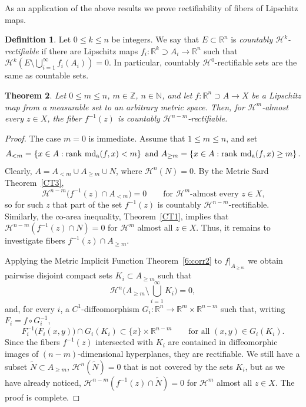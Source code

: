 \documentclass[12pt,leqno]{amsart}
\newtheorem{theorem}{Theorem}
\theoremstyle{definition}
\newtheorem{definition}[theorem]{Definition}
\newcommand{\bbbn}{\mathbb N}
\newcommand{\bbbz}{\mathbb Z}
\newcommand{\bbbr}{\mathbb R}
\def\H{{\mathcal H}}
\def\rank{{\rm rank\,}}
\def\apmd{\operatorname{md_{\rm a}}}
\numberwithin{theorem}{section} \numberwithin{equation}{section}
\begin{document}
As an application of the above results we prove rectifiability of fibers of Lipschitz maps.
\begin{definition}
Let $0\leq k\leq n$ be integers. We say that $E\subset\bbbr^n$ is {\em countably $\H^k$-rectifiable} if there are Lipschitz maps $f_i:\bbbr^k\supset A_i\to\bbbr^n$ such that $\H^k(E\setminus \bigcup_{i=1}^\infty f_i(A_i))=0$. In particular, countably $\H^0$-rectifiable sets are the same as countable sets.
\end{definition}

\begin{theorem}
\label{8.9}
Let $0\leq m\leq n$, $m\in\bbbz$, $n\in\bbbn$, and let
$f:\bbbr^n\supset A\to X$ be a Lipschitz map from a measurable set to an arbitrary metric space. Then, for
$\mathcal{H}^m$-almost every $z\in X$, the fiber $f^{-1}(z)$ is countably
$\mathcal{H}^{n-m}$-rectifiable.
\end{theorem}
\begin{proof}
The case $m=0$ is immediate. Assume that $1\leq m\leq n$, and set
\[
A_{<m}
=
\left\{
x\in A:
\rank\apmd(f,x)<m
\right\}
\text{ and }
A_{\geq m}
=
\left\{
x\in A:
\rank\apmd(f,x)\geq m
\right\}.
\]
Clearly, $A=A_{<m}\cup A_{\geq m}\cup N$, where $\H^n(N)=0$.
By the Metric Sard Theorem~\ref{CT3},
\[
\mathcal{H}^{n-m}
\bigl(f^{-1}(z)\cap A_{<m}\bigr)=0
\qquad
\text{for $\mathcal{H}^m$-almost every $z\in X$,}
\]
so for such $z$ that part of the set $f^{-1}(z)$ is countably $\H^{n-m}$-rectifiable. Similarly, the co-area inequality, Theorem~\ref{CT1}, implies that $\H^{n-m}(f^{-1}(z)\cap N)=0$ for $\H^m$ almost all $z\in X$. Thus, it remains to investigate fibers $f^{-1}(z)\cap A_{\geq m}$.

Applying the Metric Implicit Function Theorem~\ref{6:corr2} to $f|_{A_{\geq m}}$ we obtain pairwise disjoint compact sets $K_i\subset A_{\geq m}$ such that
\[
\mathcal{H}^n
\Big(
A_{\geq m}\setminus\bigcup_{i=1}^{\infty}K_i
\Big)=0,
\]
and, for every $i$,  a $C^1$-diffeomorphism
$G_i:\mathbb{R}^n\to
\mathbb{R}^m\times\mathbb{R}^{n-m}$
such that, writing $F_i=f\circ G_i^{-1}$,
\[
F_i^{-1}\bigl(F_i(x,y)\bigr)\cap G_i(K_i)
\subset
\{x\}\times\mathbb{R}^{n-m}
\qquad
\text{for all } (x,y)\in G_i(K_i).
\]
Since the fibers $f^{-1}(z)$ intersected with $K_i$ are contained in diffeomorphic images of $(n-m)$-dimensional  hyperplanes, they are rectifiable. We still have a subset $\tilde{N}\subset A_{\geq m}$, $\H^n(\tilde{N})=0$ that is not covered by the sets $K_i$, but as we have already noticed, $\H^{n-m}(f^{-1}(z)\cap\tilde{N})=0$ for $\H^m$ almost all $z\in X$. The proof is complete.
\end{proof}
\end{document}
